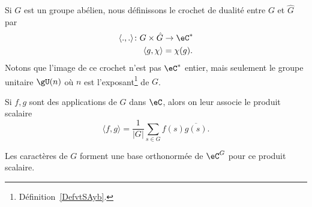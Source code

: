 Si \( G\) est un groupe abélien, nous définissons le crochet de dualité entre \( G\) et \( \hat G\) par
\begin{equation}
	\begin{aligned}
		\langle ., .\rangle \colon G\times \hat G & \to \eC^* \\
		\langle g, \chi\rangle                    & =\chi(g).
	\end{aligned}
\end{equation}
Notons que l'image de ce crochet n'est pas \( \eC^*\) entier, mais seulement le groupe unitaire \( \gU(n)\) où \( n\) est l'exposant\footnote{Définition~\ref{DefvtSAyb}.} de \( G\).


Si \( f,g\) sont des applications de \( G\) dans \( \eC\), alors on leur associe le produit scalaire
\begin{equation}
	\langle f, g\rangle =\frac{1}{ | G | }\sum_{s\in G}f(s)\overline{ g(s) }.
\end{equation}

\begin{lemma}
	Les caractères de \( G\) forment une base orthonormée de \( \eC^G\) pour ce produit scalaire.
\end{lemma}

